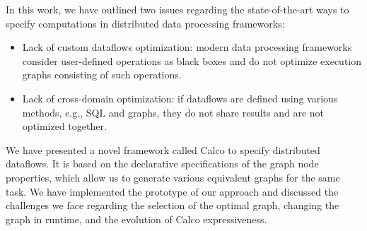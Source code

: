 
In this work, we have outlined two issues regarding the state-of-the-art ways to specify computations in distributed data processing frameworks:
\begin{itemize}
    \item Lack of custom dataflows optimization: modern data processing frameworks consider user-defined operations as black boxes and do not optimize execution graphs consisting of such operations.
    \item Lack of cross-domain optimization: if dataflows are defined using various methods, e.g., SQL and graphs, they do not share results and are not optimized together.
\end{itemize}

We have presented a novel framework called Calco to specify distributed dataflows.
It is based on the declarative specifications of the graph node properties, which allow us to generate various equivalent graphs for the same task.
We have implemented the prototype of our approach and discussed the challenges we face regarding the selection of the optimal graph, changing the graph in runtime, and the evolution of Calco expressiveness.